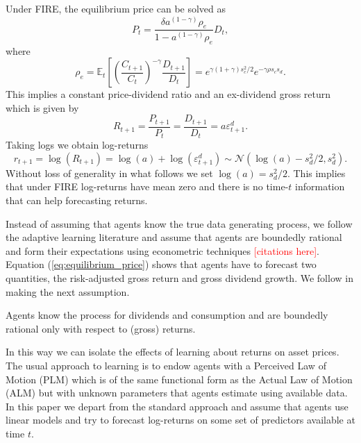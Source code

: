 \documentclass[11pt]{article}
\begin{document}
Under FIRE, the equilibrium price can be solved as
\begin{equation}
    P_t =  \frac{\delta a^{(1 - \gamma)} \rho_e}{1 - a^{(1 - \gamma)} \rho_e} D_t,
\end{equation}
where 
\begin{equation}
    \rho_e = \mathbb{E}_t \left[\left( \frac{C_{t+1}}{C_t}\right)^{- \gamma} \frac{D_{t+1}}{D_t} \right] = e ^ {\gamma(1 + \gamma) s^2_c/2} e ^ {-\gamma \rho s_c s_d} .
\end{equation}
This implies a constant price-dividend ratio and an ex-dividend gross return which is given by
\begin{equation}
    R_{t+1} = \frac{P_{t+1}}{P_t} = \frac{D_{t+1}}{D_t} = a \varepsilon^d_{t+1}.
\end{equation}
Taking logs we obtain log-returns
\begin{equation}
    r_{t+1} = \log(R_{t+1}) = \log(a) + \log(\varepsilon^d_{t+1}) \sim \mathcal{N}(\log(a) - s^2_d/2, s^2_d).
\end{equation}
Without loss of generality in what follows we set $\log(a) = s^2_d/2$. This implies that under FIRE log-returns have mean zero and there is no time-$t$ information that can help forecasting returns.

Instead of assuming that agents know the true data generating process, we follow the adaptive learning literature and assume that agents are boundedly rational and form their expectations using econometric techniques \textcolor{red}{[citations here]}.
Equation (\ref{eq:equilibrium_price}) shows that agents have to forecast two quantities, the risk-adjusted gross return and gross dividend growth.
We follow \cite{Adam2016} in making the next assumption.

\begin{assumption}
    Agents know the process for dividends and consumption and are boundedly rational only with respect to (gross) returns.
\end{assumption}
In this way we can isolate the effects of learning about returns on asset prices.
The usual approach to learning is to endow agents with a Perceived Law of Motion (PLM) which is of the same functional form as the Actual Law of Motion (ALM) but with unknown parameters that agents estimate using available data.
In this paper we depart from the standard approach and assume that agents use linear models and try to forecast log-returns on some set of predictors available at time $t$.

\end{document}
